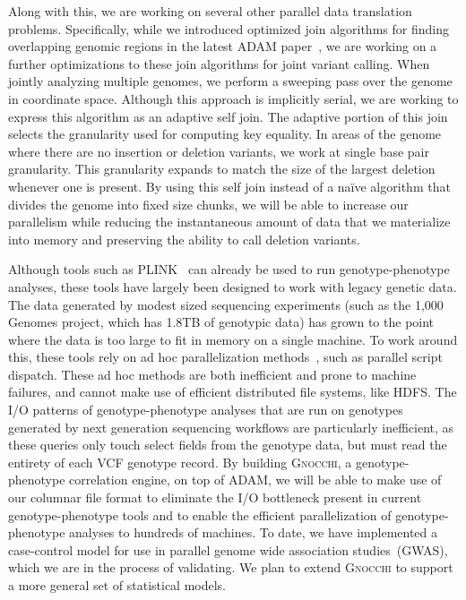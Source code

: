 \documentclass[11pt]{article} %
\begin{document}
Along with this, we are working on several other parallel data translation problems. Specifically,
while we introduced optimized join algorithms for finding overlapping genomic regions in the
latest \textsc{ADAM} paper~\cite{nothaft15}, we are working on a further optimizations to these
join algorithms for joint variant calling. When jointly analyzing multiple genomes, we perform a
sweeping pass over the genome in coordinate space. Although this approach is implicitly serial,
we are working to express this algorithm as an adaptive self join. The adaptive portion of this
join selects the granularity used for computing key equality. In areas of the genome where there
are no insertion or deletion variants, we work at single base pair granularity. This granularity
expands to match the size of the largest deletion whenever one is present. By using this self join
instead of a na\"{i}ve algorithm that divides the genome into fixed size chunks, we will be able
to increase our parallelism while reducing the instantaneous amount of data that we materialize
into memory and preserving the ability to call deletion variants.

Although tools such as \textsc{PLINK}~\cite{purcell07, chang15} can already be used to run
genotype-phenotype analyses, these tools have largely been designed to work with legacy genetic
data. The data generated by modest sized sequencing experiments (such as the 1,000 Genomes project,
which has 1.8TB of genotypic data) has grown to the point where the data is too large to fit in
memory on a single machine. To work around this, these tools rely on ad hoc parallelization
methods~\cite{chang15}, such as parallel script dispatch. These ad hoc methods are both
inefficient and prone to machine failures, and cannot make use of efficient distributed file
systems, like \textsc{HDFS}. The I/O patterns of genotype-phenotype analyses that are run on
genotypes generated by next generation sequencing workflows are particularly inefficient, as
these queries only touch select fields from the genotype data, but must read the entirety of each
VCF genotype record. By building \textsc{Gnocchi}, a genotype-phenotype correlation engine, on top
of \textsc{ADAM}, we will be able to make use of our columnar file format to eliminate the I/O
bottleneck present in current genotype-phenotype tools and to enable the efficient parallelization
of genotype-phenotype analyses to hundreds of machines. To date, we have implemented a case-control
model for use in parallel genome wide association studies~(GWAS), which we are in the process of
validating. We plan to extend \textsc{Gnocchi} to support a more general set of statistical models.
\end{document}

